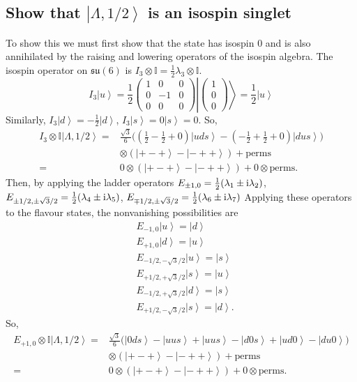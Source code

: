 \documentclass[main.tex]{subfiles}
\begin{document}
\subsection{Show that $\left|\Lambda,1/2\right>$ is an isospin singlet}
To show this we must first show that the state has isospin $0$ and is also annihilated by the raising and lowering operators of the isospin algebra. The isospin operator on $\mathfrak{su}(6)$ is $I_3\otimes\mathbb{I}=\frac{1}{2}\lambda_3\otimes\mathbb{I}$.
\begin{equation}
I_3\left|u\right>=\frac{1}{2}\begin{pmatrix}1&0&0\\0&-1&0\\0&0&0\end{pmatrix}\left|\begin{pmatrix}1\\0\\0\end{pmatrix}\right>=\frac{1}{2}\left|u\right>
\end{equation}
Similarly, $I_3\left|d\right>=-\frac{1}{2}\left|d\right>$, $I_3\left|s\right>=0\left|s\right>=0$. So,
\begin{align}
I_3\otimes\mathbb{I}\left|\Lambda,1/2\right>=&\frac{\sqrt{3}}{6}\Big((\frac{1}{2}-\frac{1}{2}+0)\left|uds\right>-(-\frac{1}{2}+\frac{1}{2}+0)\left|dus\right>\Big)\\&\otimes(\left|+-+\right>-\left|-++\right>) + \text{perms}\\
=&0\otimes(\left|+-+\right>-\left|-++\right>) + 0\otimes\text{perms}.
\end{align}
Then, by applying the ladder operators $E_{\pm1,0}=\frac{1}{2}(\lambda_1\pm\mathrm{i}\lambda_2)$, $E_{\pm1/2,\pm\sqrt{3}/2}=\frac{1}{2}(\lambda_4\pm\mathrm{i}\lambda_5)$, $E_{\mp1/2,\pm\sqrt{3}/2}=\frac{1}{2}(\lambda_6\pm\mathrm{i}\lambda_7)$
Applying these operators to the flavour states, the nonvanishing possibilities are
\begin{align}
&E_{-1,0}\left|u\right>=\left|d\right>\\
&E_{+1,0}\left|d\right>=\left|u\right>\\
&E_{-1/2,-\sqrt{3}/2}\left|u\right>=\left|s\right>\\
&E_{+1/2,+\sqrt{3}/2}\left|s\right>=\left|u\right>\\
&E_{-1/2,+\sqrt{3}/2}\left|d\right>=\left|s\right>\\
&E_{+1/2,-\sqrt{3}/2}\left|s\right>=\left|d\right>.
\end{align}
So,
\begin{align}
E_{+1,0}\otimes\mathbb{I}\left|\Lambda,1/2\right>=&\frac{\sqrt{3}}{6}\Big(\left|0ds\right>-\left|uus\right>+\left|uus\right>-\left|d0s\right>+\left|ud0\right>-\left|du0\right>\Big)\\&\otimes(\left|+-+\right>-\left|-++\right>) + \text{perms}\\
=&0\otimes(\left|+-+\right>-\left|-++\right>) + 0\otimes\text{perms}.
\end{align}
\end{document}
